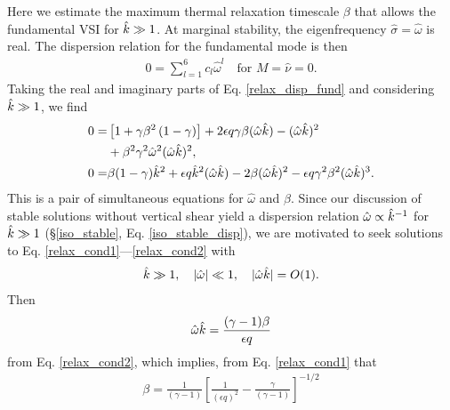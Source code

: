 Here we estimate the maximum thermal relaxation timescale
$\beta$ that allows the fundamental VSI for $\hat{k}\gg1$.   
At marginal stability, the eigenfrequency $\hat{\sigma}=\hat{\omega}$
is real. The dispersion relation for the fundamental mode is then
\begin{align}\label{relax_disp_fund}
  0 = \sum_{l=1}^{6}c_l\hat{\omega}^l \quad \text{for $M=\hat{\nu}=0$}.  
\end{align} 
Taking the real and imaginary parts of Eq. \ref{relax_disp_fund} and considering 
$\hat{k}\gg1$, we find
\begin{align}
  0 =& \left[1 + \gamma\beta^2\left(1-\gamma\right)\right] + 2\epsilon q
  \gamma\beta (\hat{\omega}\hat{k}) -  (\hat{\omega}\hat{k})^2 \notag\\
  &+ \beta^2\gamma^2\hat{\omega}^2 (\hat{\omega}\hat{k})^2,\label{relax_cond1}\\
  0=& \beta(1-\gamma)\hat{k}^2 + \epsilon q \hat{k}^2 (\hat{\omega}\hat{k})
  - 2\beta (\hat{\omega}\hat{k})^2 - \epsilon q \gamma^2\beta^2 (\hat{\omega}\hat{k})^3.\label{relax_cond2}
\end{align}
This is a pair of simultaneous equations for
$\hat{\omega}$ and $\beta$. %
Since our discussion of stable solutions  
without vertical shear yield a dispersion
relation $\hat{\omega}\propto \hat{k}^{-1}$ for $\hat{k}\gg 1$
(\S\ref{iso_stable}, Eq. \ref{iso_stable_disp}), we are motivated to
seek solutions to 
Eq. \ref{relax_cond1}---\ref{relax_cond2} with  
\begin{align}
  \hat{k} \gg1, \quad |\hat{\omega}|\ll 1 ,\quad
  |\hat{\omega}\hat{k}|=O(1). 
\end{align}
Then
\begin{align}
  \hat{\omega}\hat{k} = \frac{(\gamma-1)\beta}{\epsilon q}
\end{align}
from Eq. \ref{relax_cond2}, which implies, from Eq. \ref{relax_cond1}
that
\begin{align}
  \beta = \frac{1}{(\gamma-1)}\left[\frac{1}{\left(\epsilon
        q\right)^2} - \frac{\gamma}{(\gamma-1)}\right]^{-1/2} 
\end{align}
